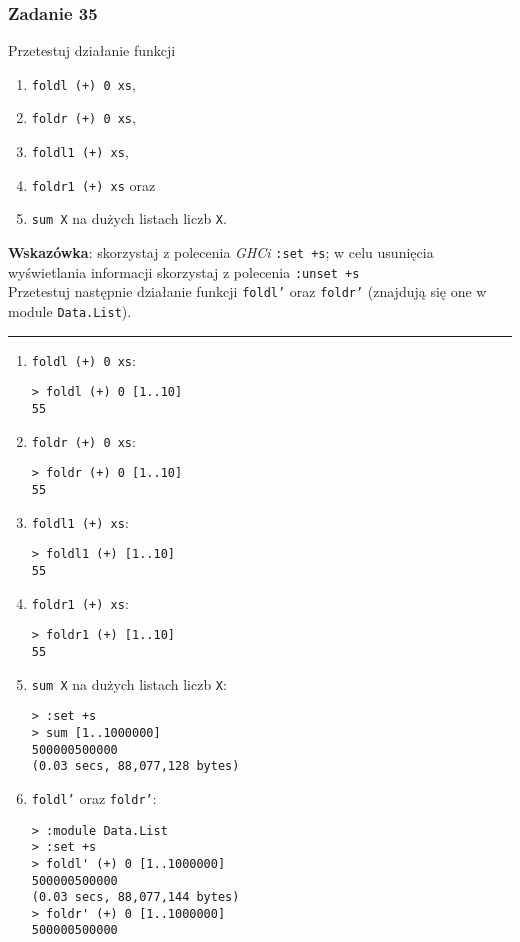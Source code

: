 \documentclass[11pt,a4paper]{article}
\begin{document}
\subsubsection{Zadanie 35}
Przetestuj działanie funkcji
\begin{enumerate}
    \item \texttt{foldl (+) 0 xs},
    \item \texttt{foldr (+) 0 xs},
    \item \texttt{foldl1 (+) xs},
    \item \texttt{foldr1 (+) xs} oraz
    \item \texttt{sum X} na dużych listach liczb \texttt{X}.
\end{enumerate}
\textbf{Wskazówka}: skorzystaj z polecenia \textit{GHCi} \texttt{:set +s}; w celu usunięcia wyświetlania informacji skorzystaj z polecenia \texttt{:unset +s} \\
Przetestuj następnie działanie funkcji \texttt{foldl’} oraz \texttt{foldr’} (znajdują się one w module \texttt{Data.List}).

\bigskip
\hrule
\bigskip

\begin{enumerate}
    \item \texttt{foldl (+) 0 xs}:
        \begin{Verbatim}[frame=single]
> foldl (+) 0 [1..10]
55
        \end{Verbatim}
    \item \texttt{foldr (+) 0 xs}:
        \begin{Verbatim}[frame=single]
> foldr (+) 0 [1..10]
55
        \end{Verbatim}
    \item \texttt{foldl1 (+) xs}:
        \begin{Verbatim}[frame=single]
> foldl1 (+) [1..10]
55
        \end{Verbatim}
    \item \texttt{foldr1 (+) xs}:
        \begin{Verbatim}[frame=single]
> foldr1 (+) [1..10]
55
        \end{Verbatim}
    \item \texttt{sum X} na dużych listach liczb \texttt{X}:
        \begin{Verbatim}[frame=single]
> :set +s
> sum [1..1000000]
500000500000
(0.03 secs, 88,077,128 bytes)
        \end{Verbatim}
    \item \texttt{foldl'} oraz \texttt{foldr'}:
        \begin{Verbatim}[frame=single]
> :module Data.List
> :set +s
> foldl' (+) 0 [1..1000000]
500000500000
(0.03 secs, 88,077,144 bytes)
> foldr' (+) 0 [1..1000000]
500000500000
        \end{Verbatim}
\end{enumerate}
\end{document}
